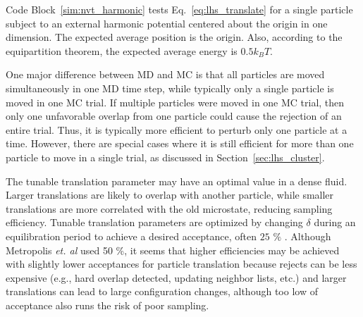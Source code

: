 \documentclass[
  9pt,
  bestpractices,
  pubversion,
]{livecoms}
\begin{document}
\begin{figure}

\end{figure}

Code Block~\ref{sim:nvt_harmonic} tests Eq.~\ref{eq:lhs_translate} for a single particle subject to an external harmonic potential centered about the origin in one dimension.
The expected average position is the origin.
Also, according to the equipartition theorem, the expected average energy is $0.5k_BT$.

One major difference between MD and MC is that all particles are moved simultaneously in one MD time step, while typically only a single particle is moved in one MC trial.
If multiple particles were moved in one MC trial, then only one unfavorable overlap from one particle could cause the rejection of an entire trial.
Thus, it is typically more efficient to perturb only one particle at a time.
However, there are special cases where it is still efficient for more than one particle to move in a single trial, as discussed in Section~\ref{sec:lhs_cluster}.

The tunable translation parameter may have an optimal value in a dense fluid.
Larger translations are likely to overlap with another particle, while smaller translations are more correlated with the old microstate, reducing sampling efficiency.
Tunable translation parameters are optimized by changing $\delta$ during an equilibration period to achieve a desired acceptance, often $25$ $\%$ \cite{kolafa_optimization_1987, jacucci_comparing_1984, chapman_metropolis_1985, mountain_quantative_1994, hatch_parallel_2020}.
Although Metropolis \textit{et. al} \cite{metropolis_equation_1953} used 50 \%, it seems that higher efficiencies may be achieved with slightly lower acceptances for particle translation because rejects can be less expensive (e.g., hard overlap detected, updating neighbor lists, etc.) and larger translations can lead to large configuration changes, although too low of acceptance also runs the risk of poor sampling.
\end{document}
